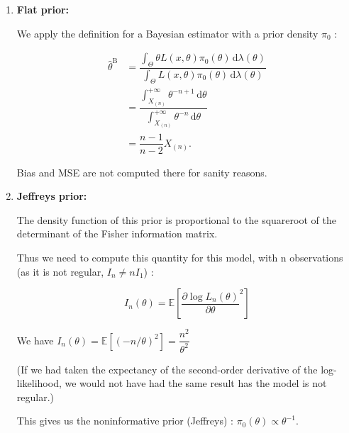 \begin{enumerate}
    \item \textbf{Flat prior:}\newline

We apply the definition for a Bayesian estimator with a prior density $\pi_0$ :

\begin{align*}
    \hat{\theta}^{\text{B}} &= \dfrac{\displaystyle \int_{\Theta} \theta L(x, \theta) \pi_0(\theta) \, \mathrm{d}\lambda(\theta)}{\displaystyle \int_{\Theta} L(x, \theta) \pi_0(\theta) \, \mathrm{d}\lambda(\theta)}\\
    &= \dfrac{\displaystyle \int_{X_{(n)}}^{+\infty} \theta^{-n+1} \, \mathrm{d}\theta}{\displaystyle \int_{X_{(n)}}^{+\infty} \theta^{-n} \, \mathrm{d}\theta}\\
    &= \dfrac{n-1}{n-2}X_{(n)}.
\end{align*}

Bias and MSE are not computed there for sanity reasons.

    \item \textbf{Jeffreys prior:}\newline

The density function of this prior is proportional to the squareroot of the determinant of the Fisher information matrix.\newline

Thus we need to compute this quantity for this model, with n observations (as it is not regular, $I_n \ne n I_1$) :

$$I_n(\theta) = \mathbb{E}\left[\dfrac{\partial \log L_n(\theta)}{\partial \theta}^2\right]$$

We have $I_n(\theta) = \mathbb{E}[(-n/\theta)^2] = \dfrac{n^2}{\theta^2}$\newline

(If we had taken the expectancy of the second-order derivative of the log-likelihood, we would not have had the same result has the model is not regular.)\newline

This gives us the noninformative prior (Jeffreys) : $\pi_0(\theta) \propto \theta^{-1}.$


\end{enumerate}




